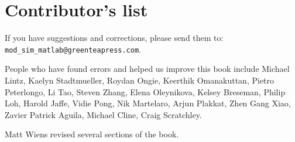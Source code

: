\documentclass[main.tex]{subfiles}
\begin{document}
\newpage

\section*{Contributor's list}

If you have suggestions and corrections, please send them to:\\
\verb"mod_sim_matlab@greenteapress.com".


People who have found errors and helped us improve this book include
Michael Lintz, 
Kaelyn Stadtmueller, 
Roydan Ongie, 
Keerthik Omanakuttan, 
Pietro Peterlongo, 
Li Tao, 
Steven Zhang, 
Elena Oleynikova, 
Kelsey Breseman, 
Philip Loh, 
Harold Jaffe, 
Vidie Pong, 
Nik Martelaro, 
Arjun Plakkat, 
Zhen Gang Xiao, 
Zavier Patrick Aguila, 
Michael Cline,
Craig Scratchley.

Matt Wiens revised several sections of the book.

\newpage
\end{document}
